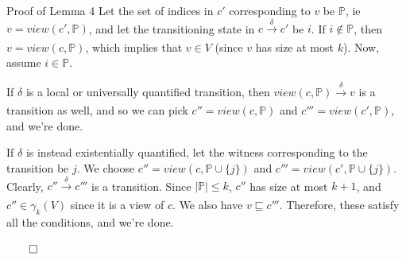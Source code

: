 \documentclass{beamer}
\begin{document}
{\begin{frame}{Proof of Lemma 4}
            Let the set of indices in $c'$ corresponding to $v$ be $\mathbb{P}$, ie $v = view(c', \mathbb{P})$, and let the transitioning state in $c \xrightarrow[]{\delta} c'$ be $i$. If $i \notin \mathbb{P}$, then $v = view(c, \mathbb{P})$, which implies that $v \in V$ (since $v$ has size at most $k$). Now, assume $i \in \mathbb{P}$.

            If $\delta$ is a local or universally quantified transition, then $view(c, \mathbb{P}) \xrightarrow[]{\delta} v$ is a transition as well, and so we can pick $c'' = view(c, \mathbb{P})$ and $c''' = view(c', \mathbb{P})$, and we're done.
            
            If $\delta$ is instead existentially quantified, let the witness corresponding to the transition be $j$. %
            We choose $c'' = view(c, \mathbb{P} \cup \{j\})$ and $c''' = view(c', \mathbb{P} \cup \{j\})$. Clearly, $c'' \xrightarrow[]{\delta} c'''$ is a transition. Since $\left|\mathbb{P}\right| \leq k$, $c''$ has size at most $k + 1$, and $c'' \in \gamma_{k}(V)$ since it is a view of $c$. We also have $v \sqsubseteq c'''$. Therefore, these satisfy all the conditions, and we're done.

            $\qed$
        \end{frame}


}
\end{document}
